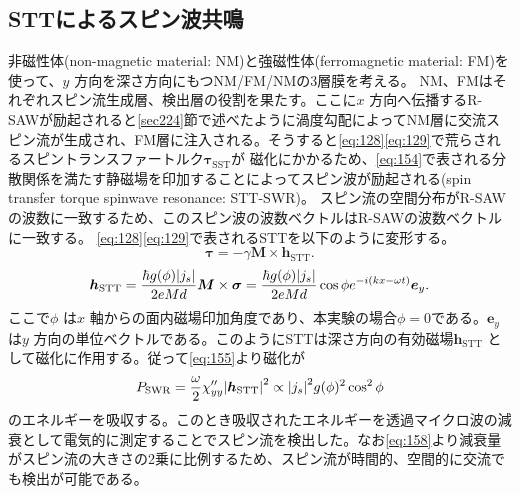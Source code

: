 \documentclass[dvipdfmx]{jsreport}
\numberwithin{equation}{chapter}
\numberwithin{table}{chapter}
\begin{document}
\subsection{STTによるスピン波共鳴}
非磁性体(non-magnetic material: NM)と強磁性体(ferromagnetic material: FM)を使って、$y$ 方向を深さ方向にもつNM/FM/NMの3層膜を考える。 NM、FMはそれぞれスピン流生成層、検出層の役割を果たす。ここに$x$ 方向へ伝播するR-SAWが励起されると\ref{sec224}節で述べたように渦度勾配によってNM層に交流スピン流が生成され、FM層に注入される。そうすると\eqref{eq:128}\eqref{eq:129}で荒らされるスピントランスファートルク$\bm{\tau}_\text{SST} $が
磁化にかかるため、\eqref{eq:154}で表される分散関係を満たす静磁場を印加することによってスピン波が励起される(spin transfer torque spinwave resonance: STT-SWR)。
スピン流の空間分布がR-SAWの波数に一致するため、このスピン波の波数ベクトルはR-SAWの波数ベクトルに一致する。
\eqref{eq:128}\eqref{eq:129}で表されるSTTを以下のように変形する。
\begin{equation}
\label{eq:156}
	\bm{\tau}=-\gamma \bm{M}\times \bm{\bm{h}}_\text{STT} 
.\end{equation}
\begin{equation}
\label{eq:157}
\bm{h}_\text{STT} =\frac{\hbar g(\phi)\abs{j_s}}{2eMd}\bm{M}\times \bm{\sigma}=\frac{\hbar g(\phi)\abs{j_s}}{2eMd}\cos \phi e^{-i(kx-\omega t)}\bm{e}_y
.\end{equation}
ここで$\phi$ は$x$ 軸からの面内磁場印加角度であり、本実験の場合$\phi=0$である。$\bm{e}_y$ は$y$ 方向の単位ベクトルである。このようにSTTは深さ方向の有効磁場$\bm{h}_\text{STT} $ として磁化に作用する。従って\eqref{eq:155}より磁化が
\begin{equation}
\label{eq:158}
	P_\text{SWR}= \frac{\omega}{2}\chi_{yy}''\abs{\bm{h}_\text{STT} }^2 \propto \abs{j_s}^2g(\phi)^2\cos ^2\phi
\end{equation}
のエネルギーを吸収する。このとき吸収されたエネルギーを透過マイクロ波の減衰として電気的に測定することでスピン流を検出した。なお\eqref{eq:158}より減衰量がスピン流の大きさの2乗に比例するため、スピン流が時間的、空間的に交流でも検出が可能である。
\end{document}
